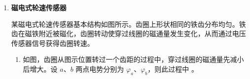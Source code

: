 \documentclass[\gkver]{gaokaozhenti}
\begin{document}
\begin{enumerate}
{2．（1）由 $x=\frac{1}{2}at^{2}$ 解得 $a=\frac{2x}{t^{2}}=\frac{2\times2}{2^{2}} \Umsq=1.0 \Umsq$。

（2）解法一：合成法

受力分析如图所示。

松鼠所受重力 $G=mg=0.3\times9.8 \UN=2.94 \UN$，所受合力 $F_{\text{合}}=ma=0.3 \UN$。

由余弦定理可得：

\[F=\sqrt{G^{2}+F_{\text{合}}^{2}-2GF_{\text{合}}\cos150^{\circ}}=\sqrt{2.94^{2}+0.3^{2}+2\times2.94\times0.3\times\frac{\sqrt{3}}{2}} \UN=3.2 \UN\]

\onepicture[h=4.0cm]{}

解法二：正交分解法

沿树枝方向和垂直树枝方向建立直角坐标系，受力分析如图所示。由正交分解法有：

$F\sin\alpha-G\cos60^{\circ}=0$，$F\cos\alpha-G\sin60^{\circ}=ma$。

又 $\sin^{2}\alpha+\cos^{2}\alpha=1$。

联立解得作用力大小为

\[F=m\sqrt{a^{2}+g^{2}+2ag\sin60^{\circ}}=0.3\times\sqrt{1.0^{2}+9.8^{2}+2\times1.0\times9.8\times\frac{\sqrt{3}}{2}} \UN=3.2 \UN\]

\onepicture[h=4.0cm]{}

3．（1）由图可知松鼠下落 $10 \Um$ 时的速度为 $9 \Ums$，由动能定理可得：

\[mgh+W_{f}=\frac{1}{2}mv^{2}-0\]

解得 $W_{f}=\frac{1}{2}mv^{2}-mgh=(0.5\times0.3\times9^{2}-0.3\times9.8\times10) \UJ=-17.25 \UJ$。

（2）取向上为正方向，由动量定理有 $(F-mg)t=0-(-mv)$，

得 $F=mg+\frac{mv}{t}=9.8m+m\frac{9}{90\times10^{-3}}=109.8m<15mg=147m$。

松鼠可以安全落地。
}

\item
\textbf{磁电式轮速传感器}

某磁电式轮速传感器基本结构如图所示。齿圈上形状相同的铁齿分布均匀。铁齿在磁铁附近被磁化，齿圈转动使穿过线圈的磁通量发生变化，从而通过电压传感器信号获得齿圈转速。

\onepicture[w=6.5cm, align=right]{}
\begin{enumerate}
	\item
	如图，齿圈从图示位置转过一个齿距的过程中，穿过线圈的磁通量先减小后增大。设 $a$、$b$ 两点电势分别为 $\varphi_{a}$、$\varphi_{b}$，则此过程中 。


\end{enumerate}
\end{enumerate}
\end{document}
